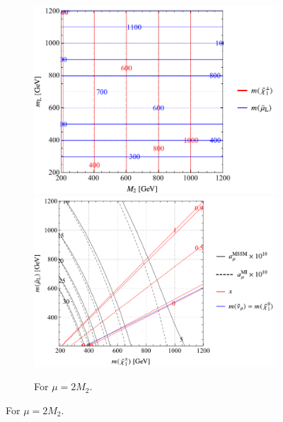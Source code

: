 \documentclass[a4paper,10pt,captions=tableheading,DIV=14]{scrartcl}
\numberwithin{equation}{section}
\begin{document}
\begin{figure}[p]
\begin{subfigure}[b]{\textwidth}
 \includegraphics[scale=0.6]{../plots/plot_spectrum_tab2_massplot.pdf}
\hfill
 \includegraphics[scale=0.6]{../plots/plot_spectrum_tab2_physplot.pdf}
\caption{\label{fig:spectra-tab2} For $\mu=2M_2$.}
\end{subfigure}

\vspace{1em}


\end{figure}
\end{document}
